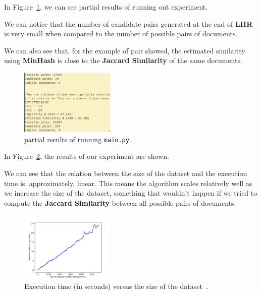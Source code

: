 \documentclass[]{article}
\begin{document}
In Figure~\ref{fig:1}, we can see partial results of running out experiment. 

We can notice that the number of candidate pairs generated at the end of \textbf{LHR} is very small when compared to the number of possible pairs of documents. 

We can also see that, for the example of pair showed, the estimated similarity using \textbf{MinHash} is close to the \textbf{Jaccard Similarity} of the same documents.

\begin{figure}[h!]
    \centering
    \captionsetup{justification=centering}
    \includegraphics[width=0.4\textwidth,height=\textheight,keepaspectratio]{../results.png}
    \caption{partial results of running \texttt{main.py}.}
    \label{fig:1}
\end{figure}

\pagebreak

In Figure~\ref{fig:2}, the results of our experiment are shown.

We can see that the relation between the size of the dataset and the execution time is, approximately, linear. This means the algorithm scales relatively well as we increase the size of the dataset, something that wouldn't happen if we tried to compute the \textbf{Jaccard Similarity} between all possible pairs of documents.

\begin{figure}[h!]
    \centering
    \captionsetup{justification=centering}
    \includegraphics[width=0.4\textwidth,height=\textheight,keepaspectratio]{../datasetsize_execution.pdf}
    \caption{Execution time (in seconds) versus the size of the dataset~\cite{sms}.}
    \label{fig:2}
\end{figure}

\printbibliography
\end{document}

